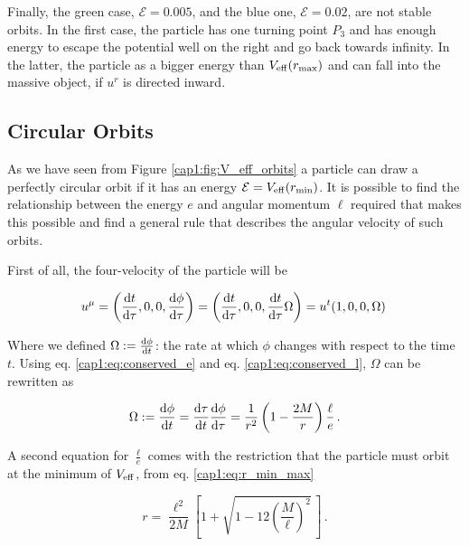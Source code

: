 Finally, the green case, $\mathcal E = 0.005$, and the blue one,
$\mathcal E = 0.02$, are not stable orbits.
In the first case, the particle has one turning point $P_3$ and has enough
energy to escape the potential well on the right and go back towards infinity.
In the latter, the particle as a bigger energy than $V_{\rm eff} (r_{\rm max})$
and can fall into the massive object, if $u^r$ is directed inward.


\subsection{Circular Orbits}
\label{cap1:ssec:circular_orbits}

As we have seen from Figure \ref{cap1:fig:V_eff_orbits} a particle can draw a
perfectly circular orbit if it has an energy $\mathcal E = V_{\rm eff}(r_{\rm min})$.
It is possible to find the relationship between the energy $e$
and angular momentum $\ell$ required that makes this possible and find a
general rule that describes the angular velocity of such orbits.

First of all, the four-velocity of the particle will be

\begin{equation}
    u^\mu = \left(\dv{t}{\tau}, 0, 0, \dv{\phi}{\tau} \right)
    = \left(\dv{t}{\tau}, 0, 0, \dv{t}{\tau} \Omega \right)
    = u^t (1, 0, 0, \Omega) \,
    \label{cap1:eq:circular_orbit_u}
\end{equation}

Where we defined $\Omega := \dv{\phi}{t}$: the rate at which $\phi$ changes with
respect to the \Sh time $t$.
Using eq. \ref{cap1:eq:conserved_e} and eq. \ref{cap1:eq:conserved_l}, $\Omega$
can be rewritten as

\begin{equation}
    \Omega := \dv{\phi}{t} = \dv{\tau}{t} \dv{\phi}{\tau} =
    \frac{1}{r^2} \left(1 - \frac{2M}{r} \right) \frac{\ell}{e}\, .
    \label{cap1:eq:Omega}
\end{equation}

A second equation for $\frac{\ell}{e}$ comes with the restriction that the
particle must orbit at the minimum of $V_{\rm eff}$, from eq.
\ref{cap1:eq:r_min_max}

\begin{equation}
    r = \frac{\ell^2}{2 M} \left[1 +
    \sqrt{1 - 12 \left( \frac{M}{\ell} \right)^2} \, \right] \, .
    \label{cap1:eq:r_min}
\end{equation}

